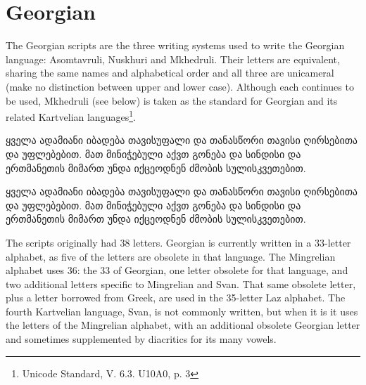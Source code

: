 \newfontfamily{}

\newfontfamily{}
\section{Georgian}
\label{sec:georgian}
The Georgian scripts are the three writing systems used to write the Georgian language: Asomtavruli, Nuskhuri and Mkhedruli. Their letters are equivalent, sharing the same names and alphabetical order and all three are unicameral (make no distinction between upper and lower case). Although each continues to be used, Mkhedruli (see below) is taken as the standard for Georgian and its related Kartvelian languages\footnote{Unicode Standard, V. 6.3. U10A0, p. 3}. 

\bgroup
\topline



\begin{scriptexample}[]{}
\georgian 

\centering
 
ყველა ადამიანი იბადება თავისუფალი და თანასწორი თავისი ღირსებითა და უფლებებით. მათ მინიჭებული აქვთ გონება და სინდისი და ერთმანეთის მიმართ უნდა იქცეოდნენ ძმობის სულისკვეთებით.
\medskip

\georgianarial
ყველა ადამიანი იბადება თავისუფალი და თანასწორი თავისი ღირსებითა და უფლებებით. მათ მინიჭებული აქვთ გონება და სინდისი და ერთმანეთის მიმართ უნდა იქცეოდნენ ძმობის სულისკვეთებით.
\bottomline
{}

\end{scriptexample}

The scripts originally had 38 letters. Georgian is currently written in a 33-letter alphabet, as five of the letters are obsolete in that language. The Mingrelian alphabet uses 36: the 33 of Georgian, one letter obsolete for that language, and two additional letters specific to Mingrelian and Svan. That same obsolete letter, plus a letter borrowed from Greek, are used in the 35-letter Laz alphabet. The fourth Kartvelian language, Svan, is not commonly written, but when it is it uses the letters of the Mingrelian alphabet, with an additional obsolete Georgian letter and sometimes supplemented by diacritics for its many vowels.